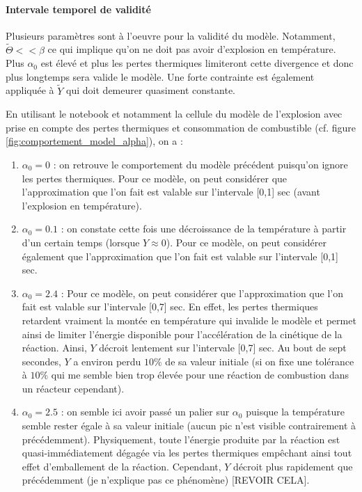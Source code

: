 \documentclass[10pt,a4paper]{report}
\begin{document}
	\paragraph{Intervale temporel de validité}
	
	Plusieurs paramètres sont à l'oeuvre pour la validité du modèle. Notamment, $\tilde{\Theta} << \beta $ ce qui implique qu'on ne doit pas avoir d'explosion en température. Plus $\alpha_0$ est élevé et plus les pertes thermiques limiteront cette divergence et donc plus longtemps sera valide le modèle.
	Une forte contrainte est également appliquée à $\tilde{Y}$ qui doit demeurer quasiment constante.
	
	En utilisant le notebook et notamment la cellule du modèle de l'explosion avec prise en compte des pertes thermiques et consommation de combustible (cf. figure \ref{fig:comportement_model_alpha}), on a :
	
	\begin{enumerate}
		\item $\alpha_0 = 0$ : on retrouve le comportement du modèle précédent puisqu'on ignore les pertes thermiques. Pour ce modèle, on peut considérer que l'approximation que l'on fait est valable sur l'intervale [0,1] sec (avant l'explosion en température).
		\item $\alpha_0 = 0.1$ : on constate cette fois une décroissance de la température à partir d'un certain temps (lorsque $Y \approx 0$). Pour ce modèle, on peut considérer également que l'approximation que l'on fait est valable sur l'intervale [0,1] sec.
		\item $\alpha_0 = 2.4$ :  Pour ce modèle, on peut considérer que l'approximation que l'on fait est valable sur l'intervale [0,7] sec. En effet, les pertes thermiques retardent vraiment la montée en température qui invalide le modèle et permet ainsi de limiter l'énergie disponible pour l'accélération de la cinétique de la réaction. Ainsi, $Y$ décroit lentement sur l'intervale [0,7] sec. Au bout de sept secondes, $Y$ a environ perdu $10 \%$ de sa valeur initiale (si on fixe une tolérance à $10 \%$ qui me semble bien trop élevée pour une réaction de combustion dans un réacteur cependant).
		\item $\alpha_0 = 2.5$ : on semble ici avoir passé un palier sur $\alpha_0$ puisque la température semble rester égale à sa valeur initiale (aucun pic n'est visible contrairement à précédemment). Physiquement, toute l'énergie produite par la réaction est quasi-immédiatement dégagée via les pertes thermiques empêchant ainsi tout effet d'emballement de la réaction. Cependant, $Y$ décroit plus rapidement que précédemment (je n'explique pas ce phénomène) [REVOIR CELA].
	\end{enumerate}
	
\end{document}
